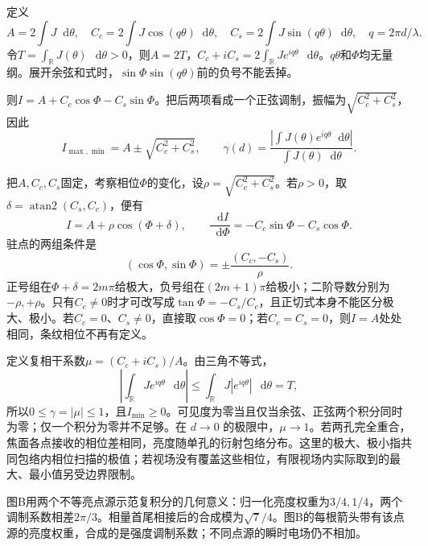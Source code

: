 \documentclass[UTF8,fontset=fandol,a4paper,11pt]{ctexart}
\newcommand{\dd}{\mathop{}\!\mathrm{d}}
\newcommand{\figcaption}[1]{\par\vspace{2pt}{\small\color{muted}#1}\par}
\begin{document}
定义
\[
A=2\int J\dd\theta,\quad
C_c=2\int J\cos(q\theta)\dd\theta,\quad
C_s=2\int J\sin(q\theta)\dd\theta,\quad q=2\pi d/\lambda.
\]
令$T=\int_{\mathbb R}J(\theta)\,\dd\theta>0$，则$A=2T$，$C_c+iC_s=2\int_{\mathbb R}J e^{iq\theta}\,\dd\theta$。$q\theta$和$\Phi$均无量纲。展开余弦和式时，$\sin\Phi\sin(q\theta)$前的负号不能丢掉。

则$I=A+C_c\cos\Phi-C_s\sin\Phi$。把后两项看成一个正弦调制，振幅为$\sqrt{C_c^2+C_s^2}$，因此
\[
I_{\max,\min}=A\pm\sqrt{C_c^2+C_s^2},\qquad
\boxed{\gamma(d)=
\frac{\left|\int J(\theta)e^{iq\theta}\dd\theta\right|}
{\int J(\theta)\dd\theta}}.
\]

把$A,C_c,C_s$固定，考察相位$\Phi$的变化，设$\rho=\sqrt{C_c^2+C_s^2}$。若$\rho>0$，取$\delta=\operatorname{atan2}(C_s,C_c)$，便有
\[
I=A+\rho\cos(\Phi+\delta),\qquad
\frac{\dd I}{\dd\Phi}=-C_c\sin\Phi-C_s\cos\Phi.
\]
驻点的两组条件是
\[
(\cos\Phi,\sin\Phi)=
\pm\frac{(C_c,-C_s)}{\rho}.
\]
正号组在$\Phi+\delta=2m\pi$给极大，负号组在$(2m+1)\pi$给极小；二阶导数分别为$-\rho,+\rho$。只有$C_c\ne0$时才可改写成$\tan\Phi=-C_s/C_c$，且正切式本身不能区分极大、极小。若$C_c=0$、$C_s\ne0$，直接取$\cos\Phi=0$；若$C_c=C_s=0$，则$I=A$处处相同，条纹相位不再有定义。

定义复相干系数$\mu=(C_c+iC_s)/A$。由三角不等式，
\[
\left|\int_{\mathbb R}J e^{iq\theta}\,\dd\theta\right|
\le\int_{\mathbb R}J|e^{iq\theta}|\,\dd\theta=T,
\]
所以$0\le\gamma=|\mu|\le1$，且$I_{\min}\ge0$。可见度为零当且仅当余弦、正弦两个积分同时为零；仅一个积分为零并不足够。在 $d\to0$ 的极限中，$\mu\to1$。若两孔完全重合，焦面各点接收的相位差相同，亮度随单孔的衍射包络分布。这里的极大、极小指共同包络内相位扫描的极值；若视场没有覆盖这些相位，有限视场内实际取到的最大、最小值另受边界限制。
\begin{center}\begin{minipage}{.98\linewidth}\centering
{}
\figcaption{解图光2.14B\quad 调制系数的加权相量}
\end{minipage}\end{center}
图B用两个不等亮点源示范复积分的几何意义：归一化亮度权重为$3/4,1/4$，两个调制系数相差$2\pi/3$。相量首尾相接后的合成模为$\sqrt7/4$。图B的每根箭头带有该点源的亮度权重，合成的是强度调制系数；不同点源的瞬时电场仍不相加。
\end{document}
